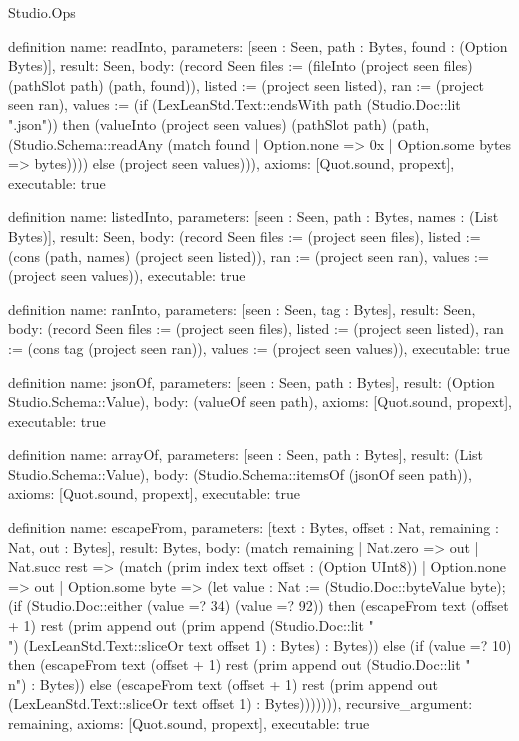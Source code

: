 \begin{lexlean}{Studio.Ops}
\begin{semanticmodule}
definition{
  name: readInto,
  parameters: [seen : Seen, path : Bytes, found : (Option Bytes)],
  result: Seen,
  body: (record Seen {files := (fileInto (project seen files) (pathSlot path) (path, found)), listed := (project seen listed), ran := (project seen ran), values := (if (LexLeanStd.Text::endsWith path (Studio.Doc::lit ".json")) then (valueInto (project seen values) (pathSlot path) (path, (Studio.Schema::readAny (match found
      | Option.none => 0x
      | Option.some bytes => bytes)))) else (project seen values))}),
  axioms: [Quot.sound, propext],
  executable: true
}

definition{
  name: listedInto,
  parameters: [seen : Seen, path : Bytes, names : (List Bytes)],
  result: Seen,
  body: (record Seen {files := (project seen files), listed := (cons (path, names) (project seen listed)), ran := (project seen ran), values := (project seen values)}),
  executable: true
}

definition{
  name: ranInto,
  parameters: [seen : Seen, tag : Bytes],
  result: Seen,
  body: (record Seen {files := (project seen files), listed := (project seen listed), ran := (cons tag (project seen ran)), values := (project seen values)}),
  executable: true
}

definition{
  name: jsonOf,
  parameters: [seen : Seen, path : Bytes],
  result: (Option Studio.Schema::Value),
  body: (valueOf seen path),
  axioms: [Quot.sound, propext],
  executable: true
}



definition{
  name: arrayOf,
  parameters: [seen : Seen, path : Bytes],
  result: (List Studio.Schema::Value),
  body: (Studio.Schema::itemsOf (jsonOf seen path)),
  axioms: [Quot.sound, propext],
  executable: true
}


definition{
  name: escapeFrom,
  parameters: [text : Bytes, offset : Nat, remaining : Nat, out : Bytes],
  result: Bytes,
  body: (match remaining
    | Nat.zero => out
    | Nat.succ rest => (match (prim index text offset : (Option UInt8))
      | Option.none => out
      | Option.some byte => (let value : Nat := (Studio.Doc::byteValue byte); (if (Studio.Doc::either (value =? 34) (value =? 92)) then (escapeFrom text (offset + 1) rest (prim append out (prim append (Studio.Doc::lit "\\") (LexLeanStd.Text::sliceOr text offset 1) : Bytes) : Bytes)) else (if (value =? 10) then (escapeFrom text (offset + 1) rest (prim append out (Studio.Doc::lit "\\n") : Bytes)) else (escapeFrom text (offset + 1) rest (prim append out (LexLeanStd.Text::sliceOr text offset 1) : Bytes))))))),
  recursive_argument: remaining,
  axioms: [Quot.sound, propext],
  executable: true
}



\end{semanticmodule}
\end{lexlean}
